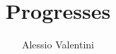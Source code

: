 \documentclass[10pt]{article}
\title{Progresses}
\author{Alessio Valentini}
\begin{document}
\maketitle
\listoftodos



\pagebreak


%



\end{document}
